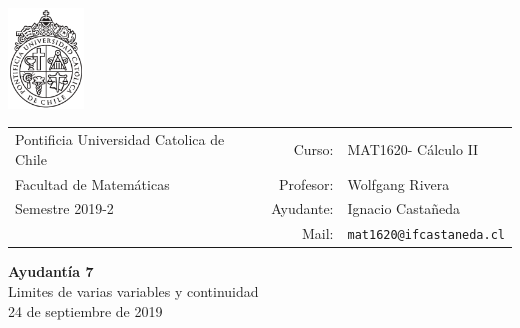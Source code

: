 \documentclass[12pt]{article}
\makeatletter
\newcommand{\ayudantia}{{\sc Ayudantía 7}}
\newcommand{\tituloayu}{Limites de varias variables y continuidad}
\newcommand{\fecha}{24 de septiembre de 2019}
\newcommand{\sigla}{MAT1620}
\newcommand{\nombre}{Cálculo II}
\newcommand{\profesor}{Wolfgang Rivera}
\newcommand{\ano}{2019}
\newcommand{\semestre}{2}
\newcommand{\mail}{mat1620@ifcastaneda.cl}
\makeatother
\begin{document}
\thispagestyle{empty}

\begin{minipage}{2cm}
	\includegraphics[width=2cm]{../../../../img/logo.pdf}
	\vspace{0.5cm}
\end{minipage}
\begin{minipage}{\linewidth}
	\begin{tabular}{lrl}
		{\scriptsize\sc Pontificia Universidad Catolica de Chile} & \hspace*{0.7in}Curso: &
		\sigla  - \nombre\\
		{\sc Facultad de Matemáticas}&
		Profesor: & \profesor \\
		{\sc Semestre \ano-\semestre} & Ayudante: & {Ignacio Castañeda}\\
		& {Mail:} & \texttt{\mail}
	\end{tabular}
\end{minipage}

\vspace{-10mm}
\begin{center}
	{\LARGE\bf \ayudantia}\\
	\vspace{0.1cm}
	{\tituloayu}\\
	\vspace{0.1cm}
	\fecha\\
	\vspace{0.4cm}
\end{center}
\end{document}
